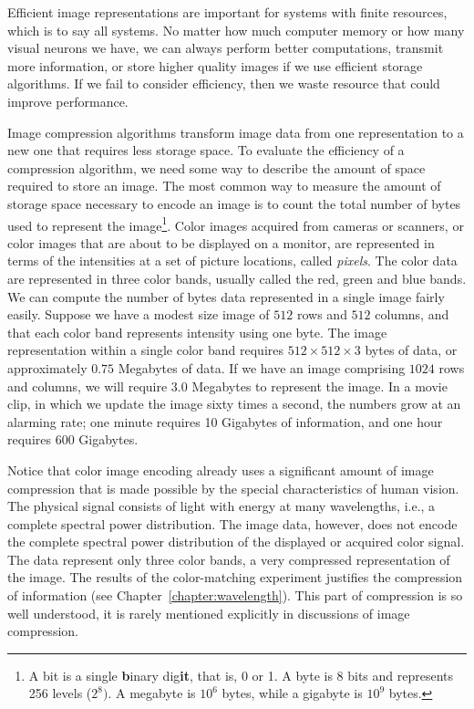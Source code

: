 Efficient image representations are important for systems with finite
resources, which is to say all systems.  No matter how much computer
memory or how many visual neurons we have, we can always perform
better computations, transmit more information, or store higher
quality images if we use efficient storage algorithms.  If we fail to
consider efficiency, then we waste resource that could improve
performance.

Image compression algorithms transform image data from one
representation to a new one that requires less storage space.  To
evaluate the efficiency of a compression algorithm, we need some way
to describe the amount of space required to store an image.  The most
common way to measure the amount of storage space necessary to encode
an image is to count the total number of bytes used to represent the
image\footnote{ A bit is a single {\bf b}inary dig{\bf it}, that is, 0
or 1.  A byte is 8 bits and represents 256 levels ($2^8)$.  A megabyte
is $10^6$ bytes, while a gigabyte is $10^9$ bytes.}.  Color images
acquired from cameras or scanners, or color images that are about to
be displayed on a monitor, are represented in terms of the intensities
at a set of picture locations, called {\em pixels}.  The color data
are represented in three color bands, usually called the red, green
and blue bands.  We can compute the number of bytes data represented
in a single image fairly easily.  Suppose we have a modest size image
of $512$ rows and $512$ columns, and that each color band represents
intensity using one byte.  The image representation within a single
color band requires $512 \times 512 \times 3$ bytes of data, or
approximately $0.75$ Megabytes of data.  If we have an image
comprising $1024$ rows and columns, we will require $3.0$ Megabytes to
represent the image.  In a movie clip, in which we update the image
sixty times a second, the numbers grow at an alarming rate; one minute
requires 10 Gigabytes of information, and one hour requires 600
Gigabytes.

Notice that color image encoding already uses a significant amount of
image compression that is made possible by the special characteristics
of human vision.  The physical signal consists of light with energy at
many wavelengths, i.e., a complete spectral power distribution.  The
image data, however, does not encode the complete spectral power
distribution of the displayed or acquired color signal.  The data
represent only three color bands, a very compressed representation of
the image.  The results of the color-matching experiment justifies the
compression of information (see Chapter~\ref{chapter:wavelength}).
This part of compression is so well understood, it is rarely mentioned
explicitly in discussions of image compression.

